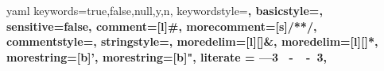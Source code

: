 

\usepackage[utf8]{inputenc}        %
\usepackage{graphicx}              %
\usepackage{hyperref}              %
\usepackage{xspace}                %


\usepackage{booktabs}              %
\usepackage{multirow}              %
\usepackage{diagbox}               %
\usepackage[flushleft]{threeparttable} %


\usepackage[caption=false]{subfig} %


\usepackage{listings}
\usepackage[htt]{hyphenat}         %

\newcommand\YAMLcolonstyle{\color{red}\mdseries}
\newcommand\YAMLkeystyle{\color{black}\bfseries}
\newcommand\YAMLvaluestyle{\color{blue}\mdseries}

\makeatletter
\newcommand\language@yaml{yaml}
\expandafter\expandafter\expandafter\lstdefinelanguage
\expandafter{\language@yaml}
{
  keywords={true,false,null,y,n},
  keywordstyle=\color{darkgray}\bfseries,
  basicstyle=\YAMLkeystyle,
  sensitive=false,
  comment=[l]{\#},
  morecomment=[s]{/*}{*/},
  commentstyle=\color{purple}\ttfamily,
  stringstyle=\YAMLvaluestyle\ttfamily,
  moredelim=[l][\color{orange}]{\&},
  moredelim=[l][\color{magenta}]{*},
  morestring=[b]',
  morestring=[b]",
  literate = {---}{{\ProcessThreeDashes}}3
             {\ -\ }{{\mdseries\ -\ }}3,
}
\makeatother


\usepackage{tikz}
\usepackage[framemethod=TikZ]{mdframed}


\usepackage{color, colortbl}
\usepackage{pifont}


\usepackage{pmboxdraw}             %


